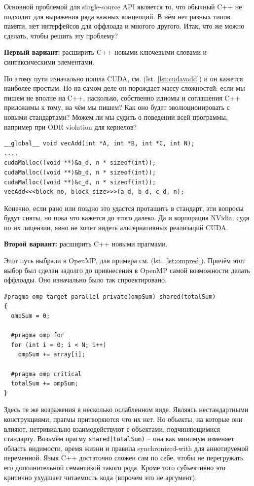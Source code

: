 \documentclass[a4paper,12pt,oneside]{article}
\begin{document}
Основной проблемой для single-source API является то, что обычный C++ не подходит для выражения ряда важных концепций. В нём нет разных типов памяти, нет интерфейсов для оффлоада и многого другого. Итак, что же можно сделать, чтобы решить эту проблему?

\textbf{Первый вариант:} расширить C++ новыми ключевыми словами и синтаксическими элементами. 

По этому пути изначально пошла CUDA, см. (lst. \ref{lst:cudavadd}) и он кажется наиболее простым.
Но на самом деле он порождает массу сложностей: если мы пишем не вполне на C++, насколько, собственно идиомы и соглашения C++ приложимы к тому, на чём мы пишем?
Как оно будет эволюционировать с новыми стандартами?
Можем ли мы судить о поведении всей программы, например при ODR violation для кернелов?

\begin{lstlisting}[caption={Векторное сложение, CUDA},label={lst:cudavadd}]
__global__ void vecAdd(int *A, int *B, int *C, int N);
....
cudaMalloc((void **)&a_d, n * sizeof(int));
cudaMalloc((void **)&b_d, n * sizeof(int));
cudaMalloc((void **)&c_d, n * sizeof(int));
vecAdd<<<block_no, block_size>>>(a_d, b_d, c_d, n);
\end{lstlisting}

Конечно, если рано или поздно это удастся протащить в стандарт, эти вопросы будут сняты, но пока что кажется до этого далеко.
Да и корпорация NVidia, судя по их лицензии, явно не хочет видеть альтернативных реализаций CUDA.

\textbf{Второй вариант:} расширить C++ новыми прагмами.

Этот путь выбрали в OpenMP, для примера см. (lst. \ref{lst:ompred}).
Причём этот выбор был сделан задолго до привнесения в OpenMP самой возможности делать оффлоады.
Оно изначально было так спроектировано.

\begin{lstlisting}[caption={Редукция, OpenMP},label={lst:ompred}]
#pragma omp target parallel private(ompSum) shared(totalSum)
{
  ompSum = 0;

  #pragma omp for
  for (int i = 0; i < N; i++)
    ompSum += array[i];

  #pragma omp critical
  totalSum += ompSum;
}
\end{lstlisting}

Здесь те же возражения в несколько ослабленном виде.
Являясь нестандартными конструкциями, прагмы притворяются что их нет.
Но объекты, на которые они влияют, нетривиально взаимодействуют с объектами, подчиняющимися стандарту.
Возьмём прагму \lstinline!shared(totalSum)! -- она как минимум изменяет область видимости, время жизни и правила synchronized-with для аннотируемой переменной.
Язык C++ достаточно сложен сам по себе, чтобы не перегружать его дополнительной семантикой такого рода.
Кроме того субъективно это критично ухудшает читаемость кода (впрочем это не аргумент).
\end{document}

